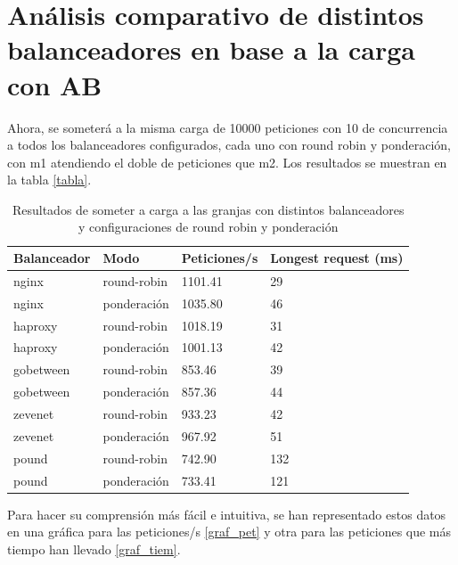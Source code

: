 \chapter{Análisis comparativo de distintos balanceadores en base a la carga con AB}

Ahora, se someterá a la misma carga de 10000 peticiones con 10 de concurrencia a todos los balanceadores configurados, cada uno con round robin y ponderación, con m1 atendiendo el doble de peticiones que m2. Los resultados se muestran en la tabla \eqref{tabla}.

\begin{table}[!ht]
\caption{Resultados de someter a carga a las granjas con distintos balanceadores y configuraciones de round robin y ponderación}
    \centering
    \begin{tabular}{|l|l|l|l|}
    \hline
        Balanceador & Modo & Peticiones/s & Longest request (ms) \\ \hline
        nginx & round-robin & 1101.41 & 29 \\ \hline
        nginx & ponderación & 1035.80 & 46 \\ \hline
        haproxy & round-robin & 1018.19 & 31 \\ \hline
        haproxy & ponderación & 1001.13 & 42 \\ \hline
        gobetween & round-robin & 853.46 & 39 \\ \hline
        gobetween & ponderación & 857.36 & 44 \\ \hline
        zevenet & round-robin & 933.23 & 42 \\ \hline
        zevenet & ponderación & 967.92 & 51 \\ \hline
        pound & round-robin & 742.90 & 132 \\ \hline
        pound & ponderación & 733.41 & 121 \\ \hline
    \end{tabular}
\label{tabla}
\end{table}

Para hacer su comprensión más fácil e intuitiva, se han representado estos datos en una gráfica para las peticiones/s \eqref{graf_pet} y otra para las peticiones que más tiempo han llevado \eqref{graf_tiem}.

